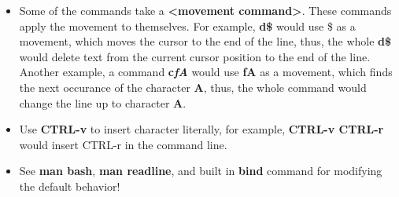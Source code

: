 \documentclass{article}
\begin{document}
\begin{itemize}
\item Some of the commands take a \textbf{{\textless}movement command{\textgreater}}. These commands apply the movement to themselves. For example, \textbf{d\$} would use \$ as a movement, which moves the cursor to the end of the line, thus, the whole \textbf{d\$} would delete text from the current cursor position to the end of the line. Another example, a command \textbf{c\textit{fA}} would use \textbf{fA} as a movement, which finds the next occurance of the character {\bf A}, thus, the whole command would change the line up to character {\bf A}.
\item Use \textbf{CTRL-v} to insert character literally, for example, \textbf{CTRL-v CTRL-r} would insert CTRL-r in the command line.
\item See \textbf{man bash}, \textbf{man readline}, and built in \textbf{bind} command for modifying the default behavior!
\end{itemize}

\vfill

\end{document}
